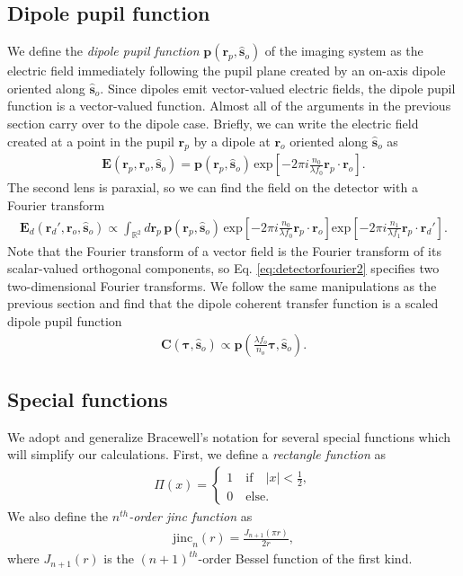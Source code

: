 \documentclass[]{osa-article}
\providecommand{\mb}[1]{\mathbf{#1}}
\providecommand{\ro}{\mathbf{\mathbf{r}}_o}
\providecommand{\so}{\mathbf{\hat{s}}_o}
\providecommand{\rp}{\mathbf{r}_p}
\providecommand{\rd}{\mathbf{r}_d}
\providecommand{\mbb}[1]{\mathbb{#1}}
\providecommand{\bs}[1]{\boldsymbol{#1}}
\providecommand{\taup}{\bs{\tau}}
\begin{document}
\subsection{Dipole pupil function}
We define the \textit{dipole pupil function} $\mb{p}(\rp, \so)$ of the imaging
system as the electric field immediately following the pupil plane created by
an on-axis dipole oriented along $\so$. Since dipoles emit vector-valued
electric fields, the dipole pupil function is a vector-valued function. Almost
all of the arguments in the previous section carry over to the dipole case.
Briefly, we can write the electric field created at a point in the pupil
$\rp$ by a dipole at $\ro$ oriented along $\so$ as
 \begin{align}
   \mb{E}(\rp, \ro, \so) = \mb{p}(\rp, \so)\,\text{exp}\left[-2\pi i \frac{n_0}{\lambda f_0} \rp\cdot\ro \right]. \label{eq:pupil2}
 \end{align}
 The second lens is paraxial, so we can find the field on the detector with a
 Fourier transform
 \begin{align}
   \mb{E}_d(\rd', \ro, \so) \propto \int_{\mbb{R}^2}d\rp\, \mb{p}(\rp, \so)\,\text{exp}\left[-2\pi i \frac{n_0}{\lambda f_0} \rp\cdot\ro \right]\text{exp}\left[-2\pi i \frac{n_1}{\lambda f_1} \rp\cdot\rd' \right]. \label{eq:detectorfourier2}
\end{align}
Note that the Fourier transform of a vector field is the Fourier transform of
its scalar-valued orthogonal components, so Eq. \ref{eq:detectorfourier2}
specifies two two-dimensional Fourier transforms. We follow the same
manipulations as the previous section and find that the dipole coherent transfer
function is a scaled dipole pupil function
\begin{align}
  \mb{C}(\taup, \so) \propto \mb{p}\left(\frac{\lambda f_o}{n_o}\taup, \so\right). \label{eq:monopupildip}
\end{align}

\subsection{Special functions}
We adopt and generalize Bracewell's notation \cite{bracewell2004} for several
special functions which will simplify our calculations. First, we define a
\textit{rectangle function} as
\begin{align}
  \Pi(x) = 
  \begin{cases}
    1\quad \text{if}\quad |x| < \frac{1}{2},\\
    0\quad \text{else}.
  \end{cases}
\end{align}
We also define the \textit{$n^{th}$-order jinc function} as
\begin{align}
  \text{jinc}_n(r) = \frac{J_{n+1}(\pi r)}{2r},
\end{align}
where $J_{n+1}(r)$ is the $(n+1)^{th}$-order Bessel function of the first kind.
\end{document}
